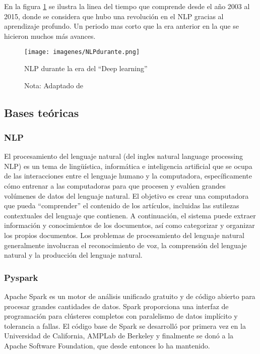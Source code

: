 \documentclass[12pt]{article}
\begin{document}
			En la figura \ref{fig:NLPdurante} se ilustra la linea del tiempo que comprende desde el año 2003 al 2015, donde se considera que hubo una revolución en el NLP gracias al aprendizaje profundo. Un periodo mas corto que la era anterior en la que se hicieron muchos más avances. 
			
			\begin{figure}[H]
				\texttt{[image: imagenes/NLPdurante.png]}
				\centering
				\caption{NLP durante la era del ``Deep learning''}
				\caption*{\small Nota: Adaptado de  \cite{Louis2020a}}
				\label{fig:NLPdurante}
			\end{figure}
	
		\subsection{Bases teóricas}
			\subsubsection{NLP}
			El procesamiento del lenguaje natural (del ingles natural language processing NLP) es un tema de lingüística, informática e inteligencia artificial que se ocupa de las interacciones entre el lenguaje humano y la computadora, específicamente cómo entrenar a las computadoras para que procesen y evalúen grandes volúmenes de datos del lenguaje natural. El objetivo es crear una computadora que pueda ``comprender'' el contenido de los artículos, incluidas las sutilezas contextuales del lenguaje que contienen. A continuación, el sistema puede extraer información y conocimientos de los documentos, así como categorizar y organizar los propios documentos.	Los problemas de procesamiento del lenguaje natural generalmente involucran el reconocimiento de voz, la comprensión del lenguaje natural y la producción del lenguaje natural. \cite{Razno2019}
			
						
			\subsubsection{Pyspark}
			Apache Spark es un motor de análisis unificado gratuito y de código abierto para procesar grandes cantidades de datos. Spark proporciona una interfaz de programación para clústeres completos con paralelismo de datos implícito y tolerancia a fallas. El código base de Spark se desarrolló por primera vez en la Universidad de California, AMPLab de Berkeley y finalmente se donó a la Apache Software Foundation, que desde entonces lo ha mantenido.\cite{Gressling2020}
			
\end{document}
